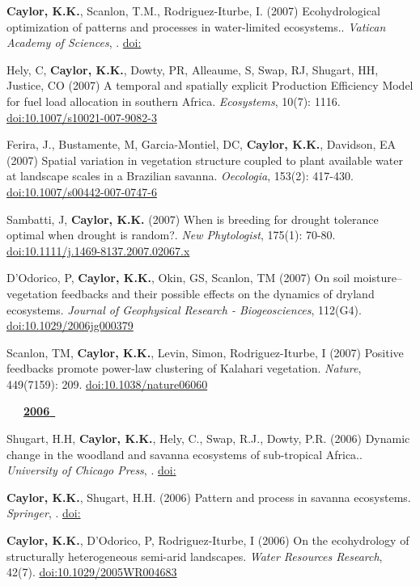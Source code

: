 \begin{etaremune}
\item \textbf{ Caylor, K.K.}, Scanlon, T.M., Rodriguez-Iturbe, I. (2007) Ecohydrological optimization of patterns and processes in water-limited ecosystems.. \emph{Vatican Academy of Sciences}, . \href{https://doi.org/}{doi:}
\item Hely, C, \textbf{ Caylor, K.K.}, Dowty, PR, Alleaume, S, Swap, RJ, Shugart, HH, Justice, CO (2007) A temporal and spatially explicit Production Efficiency Model for fuel load allocation in southern Africa. \emph{Ecosystems}, 10(7): 1116. \href{https://doi.org/10.1007/s10021-007-9082-3}{doi:10.1007/s10021-007-9082-3}
\item Ferira, J., Bustamente, M, Garcia-Montiel, DC, \textbf{ Caylor, K.K.}, Davidson, EA (2007) Spatial variation in vegetation structure coupled to plant available water at landscape scales in a Brazilian savanna. \emph{Oecologia}, 153(2): 417-430. \href{https://doi.org/10.1007/s00442-007-0747-6}{doi:10.1007/s00442-007-0747-6}
\item Sambatti, J, \textbf{ Caylor, K.K.} (2007) When is breeding for drought tolerance optimal when drought is random?. \emph{New Phytologist}, 175(1): 70-80. \href{https://doi.org/10.1111/j.1469-8137.2007.02067.x}{doi:10.1111/j.1469-8137.2007.02067.x}
\item D'Odorico, P, \textbf{ Caylor, K.K.}, Okin, GS, Scanlon, TM (2007) On soil moisture–vegetation feedbacks and their possible effects on the dynamics of dryland ecosystems. \emph{Journal of Geophysical Research - Biogeosciences}, 112(G4). \href{https://doi.org/10.1029/2006jg000379}{doi:10.1029/2006jg000379}
\item Scanlon, TM, \textbf{ Caylor, K.K.}, Levin, Simon, Rodriguez-Iturbe, I (2007) Positive feedbacks promote power-law clustering of Kalahari vegetation. \emph{Nature}, 449(7159): 209. \href{https://doi.org/10.1038/nature06060}{doi:10.1038/nature06060}

\vspace{0.1in}
\mbox{\ \ \ \underline{\textbf{2006 }}}
\vspace{0.1in}

\item Shugart, H.H, \textbf{ Caylor, K.K.}, Hely, C., Swap, R.J., Dowty, P.R. (2006) Dynamic change in the woodland and savanna ecosystems of sub-tropical Africa.. \emph{University of Chicago Press}, . \href{https://doi.org/}{doi:}
\item \textbf{ Caylor, K.K.}, Shugart, H.H. (2006) Pattern and process in savanna ecosystems. \emph{Springer}, . \href{https://doi.org/}{doi:}
\item \textbf{ Caylor, K.K.}, D'Odorico, P, Rodriguez-Iturbe, I (2006) On the ecohydrology of structurally heterogeneous semi-arid landscapes. \emph{Water Resources Research}, 42(7). \href{https://doi.org/10.1029/2005WR004683}{doi:10.1029/2005WR004683}


\end{etaremune}
